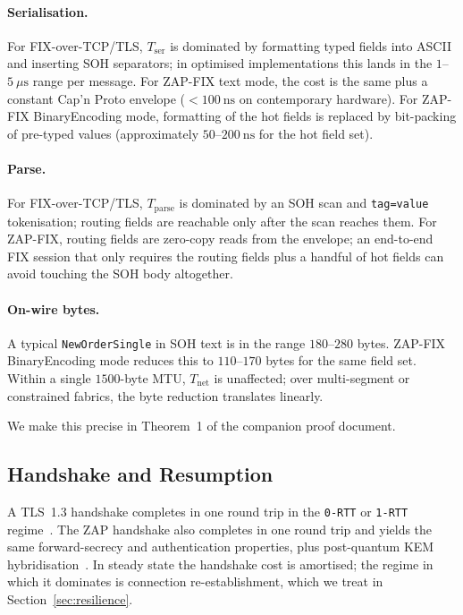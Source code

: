 \documentclass[11pt,a4paper]{article}
\begin{document}
\paragraph{Serialisation.}
For FIX-over-TCP/TLS, $T_{\mathrm{ser}}$ is dominated by formatting
typed fields into ASCII and inserting SOH separators; in optimised
implementations this lands in the $1$--$5~\mu\mathrm{s}$ range per
message. For ZAP-FIX text mode, the cost is the same plus a
constant Cap'n Proto envelope ($< 100~\mathrm{ns}$ on contemporary
hardware). For ZAP-FIX BinaryEncoding mode, formatting of the
hot fields is replaced by bit-packing of pre-typed values
(approximately $50$--$200~\mathrm{ns}$ for the hot field set).

\paragraph{Parse.}
For FIX-over-TCP/TLS, $T_{\mathrm{parse}}$ is dominated by an SOH
scan and \texttt{tag=value} tokenisation; routing fields are
reachable only after the scan reaches them. For ZAP-FIX, routing
fields are zero-copy reads from the envelope; an end-to-end FIX
session that only requires the routing fields plus a handful of
hot fields can avoid touching the SOH body altogether.

\paragraph{On-wire bytes.}
A typical \texttt{NewOrderSingle} in SOH text is in the range
$180$--$280$ bytes. ZAP-FIX BinaryEncoding mode reduces this to
$110$--$170$ bytes for the same field set. Within a single
$1500$-byte MTU, $T_{\mathrm{net}}$ is unaffected; over multi-segment
or constrained fabrics, the byte reduction translates linearly.

We make this precise in Theorem~1 of the companion proof document.

\subsection{Handshake and Resumption}

A TLS~1.3 handshake completes in one round trip in the
\texttt{0-RTT} or \texttt{1-RTT} regime~\cite{rfc8446}. The ZAP
handshake also completes in one round trip and yields the same
forward-secrecy and authentication properties, plus post-quantum
KEM hybridisation~\cite{xwing}. In steady state the handshake cost
is amortised; the regime in which it dominates is connection
re-establishment, which we treat in Section~\ref{sec:resilience}.
\end{document}
